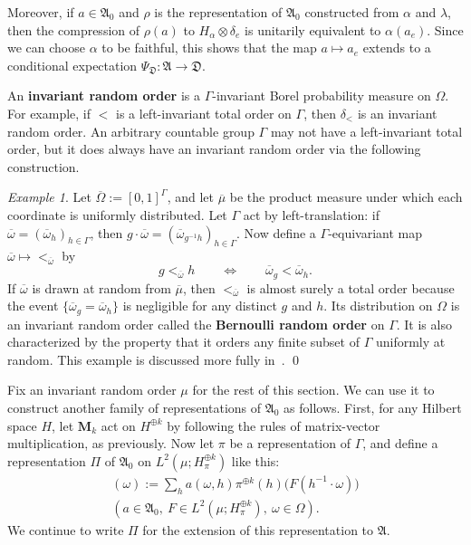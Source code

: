 \documentclass[12pt,a4paper]{article}
\numberwithin{equation}{section}
\theoremstyle{remark}
\newtheorem{ex}[thm]{Example}
\newcommand{\rmM}{\mathbf{M}}
\newcommand{\A}{\mathfrak{A}}
\newcommand{\frD}{\mathfrak{D}}
\newcommand{\G}{\Gamma}
\renewcommand{\a}{\alpha}
\renewcommand{\l}{\lambda}
\newcommand{\ol}[1]{\overline{#1}}
\begin{document}
Moreover, if $a \in \A_0$ and $\rho$ is the representation of $\A_0$ constructed from $\a$ and $\l$, then the compression of $\rho(a)$ to $H_\a\otimes \delta_e$ is unitarily equivalent to $\a(a_e)$.  Since we can choose $\a$ to be faithful, this shows that the map $a \mapsto a_e$ extends to a conditional expectation $\Psi_\frD:\A\to \frD$. %

An \textbf{invariant random order} is a $\G$-invariant Borel probability measure on $\Omega$.  For example, if $<$ is a left-invariant total order on $\G$, then $\delta_<$ is an invariant random order.  An arbitrary countable group $\G$ may not have a left-invariant total order, but it does always have an invariant random order via the following construction.

\begin{ex}\label{ex:Bern}
Let $\ol{\Omega} := [0,1]^\G$, and let $\ol{\mu}$ be the product measure under which each coordinate is uniformly distributed. Let $\G$ act by left-translation: if $\ol{\omega} = (\ol{\omega}_h)_{h \in \G}$, then $g\cdot \ol{\omega} =  (\ol{\omega}_{g^{-1}h})_{h \in \G}$.  Now define a $\G$-equivariant map $\ol{\omega}\mapsto <_{\ol{\omega}}$ by
\[g <_{\ol{\omega}} h \qquad \Leftrightarrow \qquad \ol{\omega}_g < \ol{\omega}_h.\]
If $\ol{\omega}$ is drawn at random from $\ol{\mu}$, then $<_{\ol{\omega}}$ is almost surely a total order because the event $\{\ol{\omega}_g = \ol{\omega}_h\}$ is negligible for any distinct $g$ and $h$.  Its distribution on $\Omega$ is an invariant random order called the \textbf{Bernoulli random order} on $\G$.  It is also characterized by the property that it orders any finite subset of $\G$ uniformly at random.  This example is discussed more fully in~\cite[Sec. 7]{Seward--randomorder}. \qed 
\end{ex}

Fix an invariant random order $\mu$ for the rest of this section.  We can use it to construct another family of representations of $\A_0$ as follows.  First, for any Hilbert space $H$, let $\rmM_k$ act on $H^{\oplus k}$ by following the rules of matrix-vector multiplication, as previously. Now let $\pi$ be a representation of $\G$, and define a representation $\Pi$ of $\A_0$ on $L^2(\mu;H_\pi^{\oplus k})$ like this:
\begin{multline*}
[\Pi(a)F](\omega) := \sum_h a(\omega,h)\pi^{\oplus k}(h)\big(F(h^{-1}\cdot \omega)\big) \\ (a \in \A_0,\ F \in L^2(\mu;H_\pi^{\oplus k}),\ \omega \in \Omega).
\end{multline*}
We continue to write $\Pi$ for the extension of this representation to $\A$.
\end{document}
